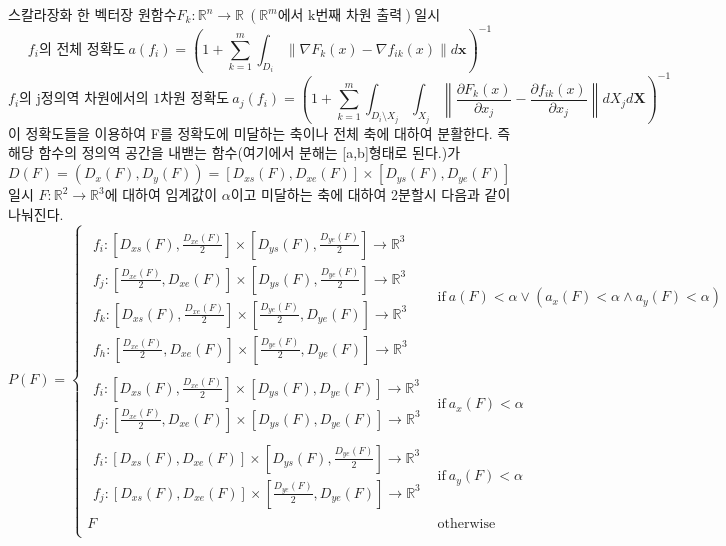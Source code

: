 \documentclass{book}
\begin{document}
스칼라장화 한 벡터장 원함수$F_k:\mathbb{R}^n \rightarrow \mathbb{R}~(\mathbb{R}^m\text{에서 k번째 차원 출력})$일시
\[
f_i\text{의 전체 정확도}~a(f_i) = \left ( 1 + \sum_{k=1}^m \int_{D_i} \lVert \nabla F_k(x) - \nabla f_{ik}(x) \rVert d \mathbf{x} \right )^{-1}
\]
\[
f_i\text{의 j정의역 차원에서의 1차원 정확도}~a_j(f_i) = \left ( 1 + \sum_{k=1}^m \int_{D_i \setminus X_j} \int_{X_j} \left \lVert \frac{\partial F_k(x)}{\partial x_j} - \frac{\partial f_{ik}(x)}{\partial x_j} \right \rVert dX_j d\mathbf{X} \right )^{-1}
\]
이 정확도들을 이용하여 F를 정확도에 미달하는 축이나 전체 축에 대하여 분활한다. 즉 해당 함수의 정의역 공간을 내밷는 함수(여기에서 분해는 [a,b]형태로 된다.)가 $D(F)=(D_x(F),D_y(F))=[D_{xs}(F),D_{xe}(F)] \times [D_{ys}(F),D_{ye}(F)]$일시 $F:\mathbb{R}^2 \rightarrow \mathbb{R}^3$에 대하여 임계값이 $\alpha$이고 미달하는 축에 대하여 2분할시 다음과 같이 나눠진다.
\[
P(F)=
\begin{cases}
\begin{matrix}
f_i: [D_{xs}(F),\frac{D_{xe}(F)}{2}] \times [D_{ys}(F),\frac{D_{ye}(F)}{2}]\rightarrow \mathbb{R}^3 \\
f_j: [\frac{D_{xe}(F)}{2},D_{xe}(F)] \times [D_{ys}(F),\frac{D_{ye}(F)}{2}]\rightarrow \mathbb{R}^3 \\
f_k: [D_{xs}(F),\frac{D_{xe}(F)}{2}] \times [\frac{D_{ye}(F)}{2},D_{ye}(F)]\rightarrow \mathbb{R}^3 \\
f_h: [\frac{D_{xe}(F)}{2},D_{xe}(F)] \times [\frac{D_{ye}(F)}{2},D_{ye}(F)]\rightarrow \mathbb{R}^3
\end{matrix} & \text{if}~ a(F) < \alpha \lor (a_x(F) < \alpha \land a_y(F) < \alpha) \\
\begin{matrix}
f_i:[D_{xs}(F),\frac{D_{xe}(F)}{2}] \times [D_{ys}(F),D_{ye}(F)] \rightarrow \mathbb{R}^3 \\
f_j:[\frac{D_{xe}(F)}{2},D_{xe}(F)] \times [D_{ys}(F),D_{ye}(F)] \rightarrow \mathbb{R}^3
\end{matrix} & \text{if}~ a_x(F) < \alpha \\
\begin{matrix}
f_i:[D_{xs}(F),D_{xe}(F)] \times [D_{ys}(F),\frac{D_{ye}(F)}{2}] \rightarrow \mathbb{R}^3 \\
f_j:[D_{xs}(F),D_{xe}(F)] \times [\frac{D_{ye}(F)}{2},D_{ye}(F)] \rightarrow \mathbb{R}^3
\end{matrix} & \text{if}~ a_y(F) < \alpha \\
F & \text{otherwise}\\
\end{cases}
\]
\end{document}

